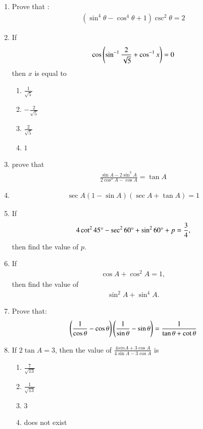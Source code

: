 \begin{enumerate}
\hfill{}\item Prove that : 
        \begin{align}
           (\sin^{4}{\theta} - \cos^{4}{\theta} + 1)\csc^{2}{\theta} = 2 
        \end{align}
\hfill{}
\item
If
\begin{align}
\cos\left(\sin^{-1}{\frac{2}{\sqrt{5}}} + \cos^{-1}{x}\right) = 0
\end{align}
then $x$ is equal to
		\begin{multicols}{4}
\begin{enumerate}
	\item $\frac{1}{\sqrt{5}}$
	\item $-\frac{2}{\sqrt{5}}$
	\item $\frac{2}{\sqrt{5}}$
        \item $1$
\end{enumerate}
		\end{multicols}
\hfill{}
\item prove that \begin{align} \frac{\sin A-2 \sin^3A}{2\cos^3A-\cos A}=\tan A\end{align} 
  \hfill{}\item \begin{align} \sec A (1-\sin A)(\sec A+\tan A)=1\end{align} 

\hfill{}\item If 
\begin{align}
    4\cot^2 45\degree - \sec^2 60\degree + \sin^2 60\degree + p = \frac{3}{4}, 
\end{align}
then find the value of $p$.
\hfill{}\item If 
\begin{align}
    \cos A+ \cos^2A=1,
\end{align}then find the value of 
\begin{align}
\sin^2A+\sin^4A.
\end{align}
\hfill{}\item Prove that:\\
\begin{align}
\left(\frac{1}{\cos\theta}-\cos\theta\right)\left(\frac{1}{\sin\theta}-\sin\theta\right) = \frac{1}{\tan\theta+\cot\theta}
\end{align}




\hfill{}\item If $2\tan A=3$, then the value of $\frac{4sin A + 3\cos A}{4\sin A - 3\cos A}$ is
\begin{enumerate}
\item $\frac{7}{\sqrt{13}}$
\item $\frac{1}{\sqrt{13}}$
\item $3$
\item does not exist
\end{enumerate}




\end{enumerate}
